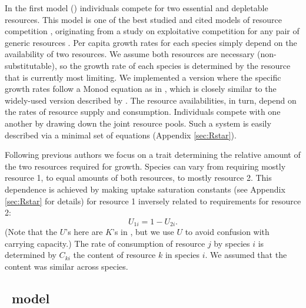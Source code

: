 \documentclass[a4paper,11pt]{article}
\begin{document}
In the first model (\Rstar) individuals compete for two essential and
depletable resources. This model is one of the best studied and cited
models of resource competition \citep{Tilman-1977, Tilman-1982,
  Huisman-2001}, originating from a study on exploitative competition
for any pair of generic resources \citep{Leon-1975}. Per capita growth rates for each species simply depend on the availability of two resources.  We assume both
resources are necessary (non-substitutable), so the growth rate
of each species is determined by the resource that is currently most
limiting.  We implemented a version where the specific growth rates
follow a Monod equation as in \citet{Huisman-2001}, which is closely
similar to the widely-used version described by \citet{Tilman-1977,
  Tilman-1982}.
 The resource availabilities, in turn, depend on the
rates of resource supply and consumption. Individuals compete with one
another by drawing down the joint resource pools. Such a system is
easily described via a minimal set of equations (Appendix
\ref{sec:Rstar}).

Following previous authors \citep{Tilman-1985, Schreiber-2003,
  Fox-2008} we focus on a trait determining the relative amount of the
two resources required for growth. Species can vary from requiring
mostly resource 1, to equal amounts of both resources, to mostly
resource 2. This dependence is achieved by making uptake saturation
constants (see Appendix \ref{sec:Rstar} for details) for resource 1
inversely related to requirements for resource 2:
\begin{equation}
\label{eq:R3}
U_{1i} = 1 - U_{2i}.
\end{equation}
(Note that the $U$'s here are $K$'s in \citet{Huisman-2001}, but we
use $U$ to avoid confusion with carrying capacity.)
The rate of consumption of resource $j$ by species $i$ is determined by
$C_{ki}$ the content of resource $k$ in species $i$. We assumed that
the content was similar across species.

%

\subsection{\plant\ model}
\end{document}
